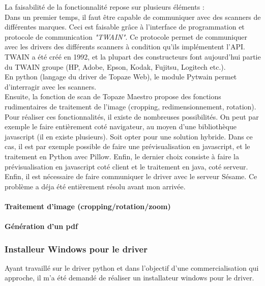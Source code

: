 La faisabilité de la fonctionnalité repose sur plusieurs éléments :\\
Dans un premier temps, il faut être capable de communiquer avec des scanners de différentes marques. Ceci est faisable grâce à l'interface de programmation et protocole de communication \textit{"TWAIN"}. Ce protocole permet de communiquer avec les drivers des différents scanners à condition qu'ils implémentent l'API.\\
TWAIN a été créé en 1992, et la plupart des constructeurs font aujourd'hui partie du TWAIN groupe (HP, Adobe, Epson, Kodak, Fujitsu, Logitech etc.).\\
En python (langage du driver de Topaze Web), le module Pytwain permet d'interragir avec les scanners.\\

Ensuite, la fonction de scan de Topaze Maestro propose des fonctions rudimentaires de traitement de l'image (cropping, redimensionnement, rotation). 
Pour réaliser ces fonctionnalités, il existe de nombreuses possibilités. On peut par exemple le faire entièrement coté navigateur, au moyen d'une bibliothèque javascript (il en existe plusieurs). Soit opter pour une solution hybride. Dans ce cas, il est par exemple possible de faire une prévisualisation en javascript, et le traitement en Python avec Pillow. 
Enfin, le dernier choix consiste à faire la prévisualisation en javascript coté client et le traitement en java, coté serveur. \\

Enfin, il est nécessaire de faire communiquer le driver avec le serveur Sésame. Ce problème a déja été entièrement résolu avant mon arrivée.

\paragraph*{Traitement d'image (cropping/rotation/zoom)}

\paragraph*{Génération d'un pdf}
		
\subsubsection{Installeur Windows pour le driver}
Ayant travaillé sur le driver python et dans l'objectif d'une commercialisation qui approche, il m'a été demandé de réaliser un installateur windows pour le driver.\\

